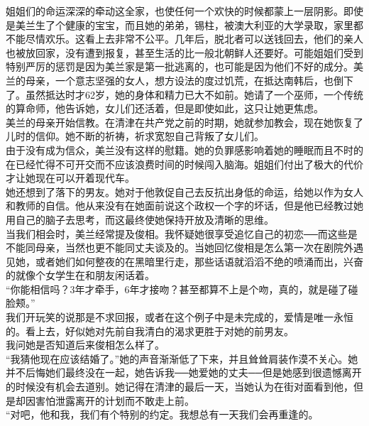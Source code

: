 姐姐们的命运深深的牵动这全家，也使任何一个欢快的时候都蒙上一层阴影。即使是美兰生了个健康的宝宝，而且她的弟弟，锡柱，被澳大利亚的大学录取，家里都不能尽情欢乐。这看上去非常不公平。几年后，脱北者可以送钱回去，他们的亲人也被放回家，没有遭到报复，甚至生活的比一般北朝鲜人还要好。可能姐姐们受到特别严厉的惩罚是因为美兰家是第一批逃离的，也可能是因为他们不好的成分。美兰的母亲，一个意志坚强的女人，想方设法的度过饥荒，在抵达南韩后，也倒下了。虽然抵达时才62岁，她的身体和精力已大不如前。她请了一个巫师，一个传统的算命师，他告诉她，女儿们还活着，但是即使如此，这只让她更焦虑。\\

美兰的母亲开始信教。在清津在共产党之前的时期，她就参加教会，现在她恢复了儿时的信仰。她不断的祈祷，祈求宽恕自己背叛了女儿们。\\

由于没有成为信众，美兰没有这样的慰籍。她的负罪感影响着她的睡眠而且不时的在已经忙得不可开交而不应该浪费时间的时候闯入脑海。姐姐们付出了极大的代价才让她现在可以开着现代车。\\

她还想到了落下的男友。她对于他敦促自己去反抗出身低的命运，给她以作为女人和教师的自信。他从来没有在她面前说这个政权一个字的坏话，但是他已经教过她用自己的脑子去思考，而这最终使她保持开放及清晰的思维。\\

当我们相会时，美兰经常提及俊相。我怀疑她很享受追忆自己的初恋──而这些是不能同母亲，当然也更不能同丈夫谈及的。当她回忆俊相是怎么第一次在剧院外遇见她，或者她们如何整夜的在黑暗里行走，那些话语就滔滔不绝的喷涌而出，兴奋的就像个女学生在和朋友闲话着。\\

“你能相信吗？3年才牵手，6年才接吻？甚至都算不上是个吻，真的，就是碰了碰脸颊。”\\

我们开玩笑的说那是不求回报，或者在这个例子中是未完成的，爱情是唯一永恒的。看上去，好似她对先前自我清白的渴求更胜于对她的前男友。\\

我问她是否知道后来俊相怎么样了。\\

“我猜他现在应该结婚了。”她的声音渐渐低了下来，并且耸耸肩装作漠不关心。她并不后悔她们最终没在一起，她告诉我──她爱她的丈夫──但是她感到很遗憾离开的时候没有机会去道别。她记得在清津的最后一天，当她认为在街对面看到他，但是却因害怕泄露离开的计划而不敢走上前。\\

“对吧，他和我，我们有个特别的约定。我想总有一天我们会再重逢的。\\

